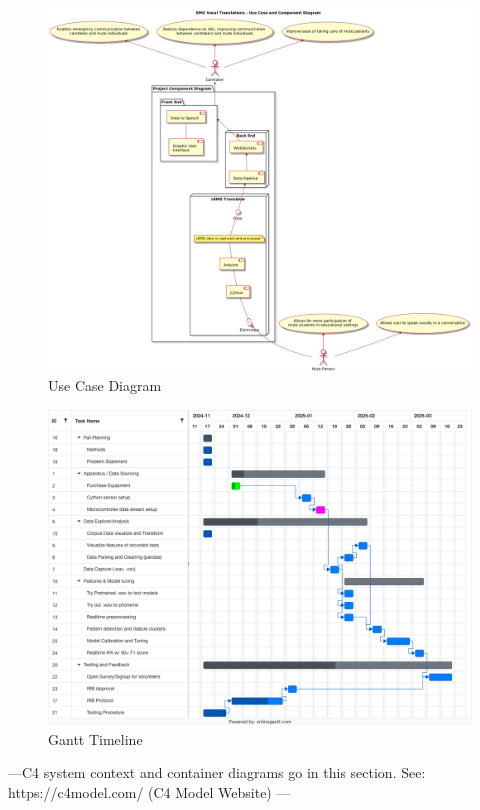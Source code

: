 \begin{figure}
    \centering
    \includegraphics[width=1\linewidth]{Images/UML-2.png}
    \caption{Use Case Diagram}
    \label{fig:enter-label}
\end{figure}
\begin{figure}
    \centering
    \includegraphics[width=1\linewidth]{Images/emg_vocal_gantt.png}
    \caption{Gantt Timeline}
    \label{fig:enter-label}
\end{figure}
---C4 system context and container diagrams go in this section. See: https://c4model.com/ (C4 Model Website)  ---

